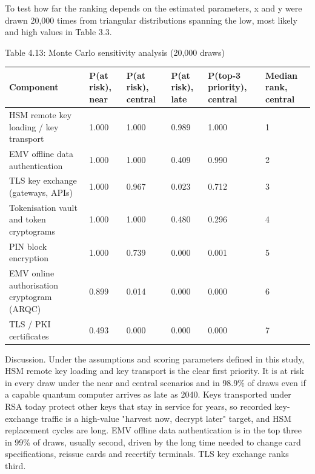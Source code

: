 \documentclass[12pt,oneside]{report}
\begin{document}
To test how far the ranking depends on the estimated parameters, x and y were drawn 20,000 times from triangular distributions spanning the low, most likely and high values in Table 3.3.
\par

\label{tab:4.13}Table 4.13: Monte Carlo sensitivity analysis (20,000 draws)
\par

\begin{center}\footnotesize\begin{tabularx}{\textwidth}{|W|W|W|W|W|W|}\hline
Component & P(at risk), near & P(at risk), central & P(at risk), late & P(top-3 priority), central & Median rank, central \\\hline
HSM remote key loading / key transport & 1.000 & 1.000 & 0.989 & 1.000 & 1 \\\hline
EMV offline data authentication & 1.000 & 1.000 & 0.409 & 0.990 & 2 \\\hline
TLS key exchange (gateways, APIs) & 1.000 & 0.967 & 0.023 & 0.712 & 3 \\\hline
Tokenisation vault and token cryptograms & 1.000 & 1.000 & 0.480 & 0.296 & 4 \\\hline
PIN block encryption & 1.000 & 0.739 & 0.000 & 0.001 & 5 \\\hline
EMV online authorisation cryptogram (ARQC) & 0.899 & 0.014 & 0.000 & 0.000 & 6 \\\hline
TLS / PKI certificates & 0.493 & 0.000 & 0.000 & 0.000 & 7 \\\hline\end{tabularx}\end{center}

Discussion. Under the assumptions and scoring parameters defined in this study, HSM remote key loading and key transport is the clear first priority. It is at risk in every draw under the near and central scenarios and in 98.9\% of draws even if a capable quantum computer arrives as late as 2040. Keys transported under RSA today protect other keys that stay in service for years, so recorded key-exchange traffic is a high-value "harvest now, decrypt later" target, and HSM replacement cycles are long. EMV offline data authentication is in the top three in 99\% of draws, usually second, driven by the long time needed to change card specifications, reissue cards and recertify terminals. TLS key exchange ranks third.
\par
\end{document}
